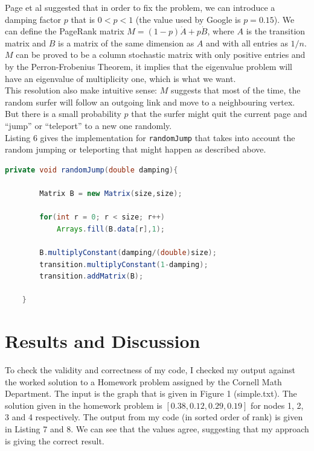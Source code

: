 \documentclass[9.5pt]{extarticle}
\begin{document}
Page et al suggested that in order to fix the problem, we can introduce a damping factor $p$ that is $0<p<1$ (the value used by Google is $p = 0.15$). We can define the PageRank matrix $M = (1-p)\dot A + p\dot B$, where $A$ is the transition matrix and $B$ is a matrix of the same dimension as $A$ and with all entries as $1/n$. $M$ can be proved to be a column stochastic matrix with only positive entries and by the Perron-Frobenius Theorem, it implies that the eigenvalue problem will have an eigenvalue of multiplicity one, which is what we want. \\

This resolution also make intuitive sense: $M$ suggests that most of the time, the random surfer will follow an outgoing link and move to a neighbouring vertex. But there is a small probability $p$ that the surfer might quit the current page and ``jump'' or ``teleport'' to a new one randomly.\\

Listing 6 gives the implementation for \verb`randomJump` that takes into account the random jumping or teleporting that might happen as described above.

\begin{lstlisting}[language=java,caption={randomJump}]
    private void randomJump(double damping){

        Matrix B = new Matrix(size,size);

        for(int r = 0; r < size; r++)
            Arrays.fill(B.data[r],1);

        B.multiplyConstant(damping/(double)size);
        transition.multiplyConstant(1-damping);
        transition.addMatrix(B);

    }
\end{lstlisting}

\section{Results and Discussion}

To check the validity and correctness of my code, I checked my output against the worked solution to a Homework problem assigned by the Cornell Math Department. The input is the graph that is given in Figure 1 (simple.txt). The solution given in the homework problem is $[0.38,0.12,0.29,0.19]$ for nodes 1, 2, 3 and 4 respectively. The output from my code (in sorted order of rank) is given in Listing 7 and 8. We can see that the values agree, suggesting that my approach is giving the correct result.\\
\end{document}
